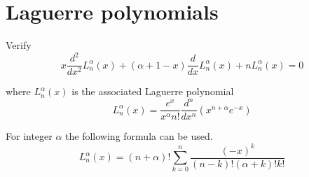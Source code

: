 

\section*{Laguerre polynomials}

Verify
\begin{equation*}
x\frac{d^2}{dx^2}L_n^\alpha(x)+(\alpha+1-x)\frac{d}{dx}L_n^\alpha(x)+nL_n^\alpha(x)=0
\end{equation*}

where $L_n^\alpha(x)$ is the associated Laguerre polynomial
\begin{equation*}
L_n^\alpha(x)=\frac{e^x}{x^\alpha n!}\frac{d^n}{dx^n}(x^{n+\alpha}e^{-x})
\end{equation*}

For integer $\alpha$ the following formula can be used.
\begin{equation*}
L_n^\alpha(x)=(n+\alpha)!\sum_{k=0}^n\frac{(-x)^k}{(n-k)!(\alpha+k)!k!}
\end{equation*}


